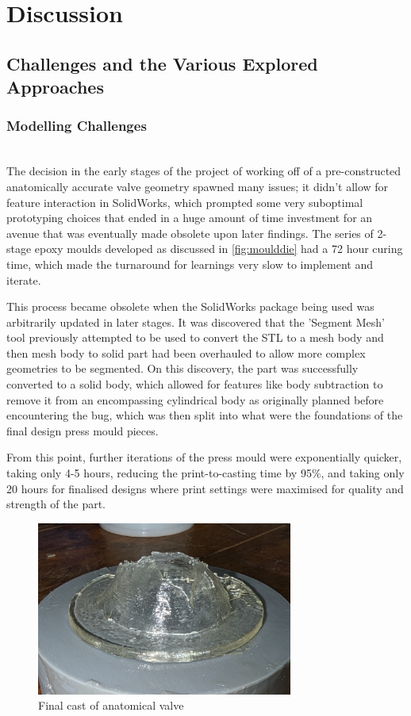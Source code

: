 \chapter{Discussion}\label{ch:Discussion}
\synopsisDiscussion

\section{Challenges and the Various Explored Approaches}
\subsection{Modelling Challenges}
\\
The decision in the early stages of the project of working off of a pre-constructed anatomically accurate valve geometry spawned many issues; it didn't allow for feature interaction in SolidWorks, which prompted some very suboptimal prototyping choices that ended in a huge amount of time investment for an avenue that was eventually made obsolete upon later findings. The series of 2-stage epoxy moulds developed as discussed in \cref{fig:moulddie} had a 72 hour curing time, which made the turnaround for learnings very slow to implement and iterate.

This process became obsolete when the SolidWorks package being used was arbitrarily updated in later stages. It was discovered that the 'Segment Mesh' tool previously attempted to be used to convert the STL to a mesh body and then mesh body to solid part had been overhauled to allow more complex geometries to be segmented. On this discovery, the part was successfully converted to a solid body, which allowed for features like body subtraction to remove it from an encompassing cylindrical body as originally planned before encountering the bug, which was then split into what were the foundations of the final design press mould pieces.

From this point, further iterations of the press mould were exponentially quicker, taking only 4-5 hours, reducing the print-to-casting time by 95\%, and taking only 20 hours for finalised designs where print settings were maximised for quality and strength of the part.
\begin{figure}[H]
    \centering
    \includegraphics[width=0.75\textwidth]{figures/latercastnice.jpg}
    \caption{Final cast of anatomical valve}
    \label{fig:cast1}
\end{figure}

